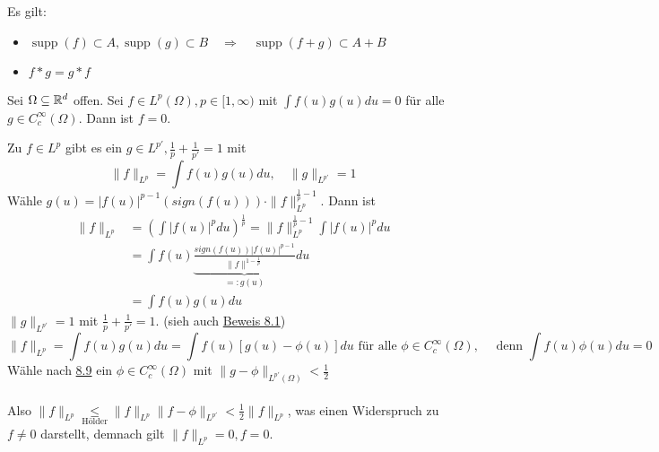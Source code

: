 \begin{bemerkung*}
	Es gilt:
	\begin{itemize}
		\item $\operatorname{supp}(f) \subset A, \operatorname{supp}(g) \subset B \quad \Rightarrow  \quad \operatorname{supp}(f + g) \subset A + B $
		\item $f \ast g = g \ast f$
	\end{itemize}	
\end{bemerkung*}


\begin{kor} \label{kor:8.10}
	Sei $\Omega \subseteq \mathbb{R}^{d}$ offen. Sei $f \in L^{p}(\Omega), p \in [1, \infty)$ mit $\int f(u) g(u) du = 0$ für alle $g \in C_{c}^{\infty}(\Omega)$. Dann ist $f = 0$.
	\begin{beweis}
		Zu $f \in L^{p}$ gibt es ein $g \in L^{p'}, \frac{1}{p} + \frac{1}{p'} = 1$ mit 
		\[ \| f \|_{L^{p}} = \int f(u) g(u) du, \quad \| g \|_{L^{p'}} = 1 \]
		Wähle $g(u) = |f(u)|^{p - 1} \left( sign(f(u)) \right) \cdot \| f \|_{L^{p}}^{\frac{1}{p} - 1}$. Dann ist
		\begin{align*}
			\| f \|_{L^{p}} & = \left( \int |f(u)|^{p} du \right)^{\frac{1}{p}} = \| f \|_{L^{p}}^{\frac{1}{p} - 1} \int |f(u)|^{p} du \\
			& = \int f(u) \underbrace{\frac{sign(f(u)) |f(u)|^{p - 1}}{\| f \|^{1 - \frac{1}{p}}}}_{=: g(u)} du \\
			& = \int f(u) g(u) du
		\end{align*}
		$\| g \|_{L^{p'}} = 1$ mit $\frac{1}{p} + \frac{1}{p'} = 1$. (sieh auch \hyperref[satz:8.1]{Beweis 8.1}) 
		\[ \| f \|_{L^{p}} = \int f(u) g(u) du = \int f(u) [g(u) - \phi(u)] du \text{ für alle } \phi \in C_{c}^{\infty}(\Omega), \quad \text{ denn } \int f(u) \phi(u) du = 0 \]
		Wähle nach \hyperref[kor:8.9]{8.9} ein $\phi \in C_{c}^{\infty}(\Omega)$ mit $\| g - \phi \|_{L^{p'}(\Omega)} < \frac{1}{2}$ \\ \\
		Also $\| f \|_{L^{p}} \underset{\text{Hölder}}{\leq} \| f \|_{L^{p}} \| f - \phi \|_{L^{p'}} < \frac{1}{2} \| f \|_{L^{p}}$, was einen Widerspruch zu $f \neq 0$ darstellt, demnach gilt $\| f \|_{L^{p}} = 0, f = 0$.
	\end{beweis}

\end{kor}

\newpage






























	